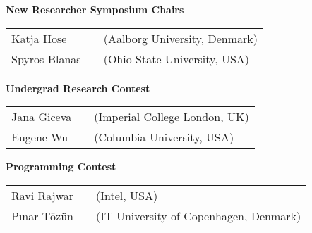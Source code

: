{\vfill
\textbf{New Researcher Symposium Chairs}

\begin{tabular}{lp{.5em}l}
Katja Hose	&& \textsf{\small(Aalborg University, Denmark)}	\\
Spyros Blanas	&& \textsf{\small(Ohio State University, USA)}
\end{tabular}

\vfill
\textbf{Undergrad Research Contest}

\begin{tabular}{lp{.5em}l}
Jana Giceva	&& \textsf{\small(Imperial College London, UK)}	\\
Eugene Wu	&& \textsf{\small(Columbia University, USA)}
\end{tabular}

\vfill
\textbf{Programming Contest}

\begin{tabular}{lp{.5em}l}
Ravi Rajwar	&& \textsf{\small(Intel, USA)}	\\
Pınar Tözün	&& \textsf{\small(IT University of Copenhagen, Denmark)}
\end{tabular}

}
